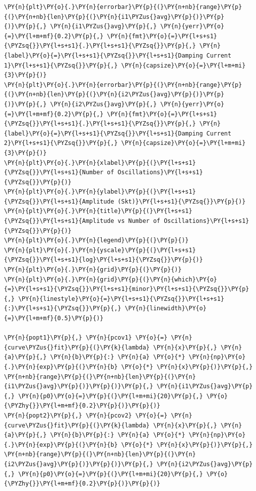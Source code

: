     \begin{tcolorbox}[breakable, size=fbox, boxrule=1pt, pad at break*=1mm,colback=cellbackground, colframe=cellborder]
\begin{Verbatim}[commandchars=\\\{\}]
\PY{n}{plt}\PY{o}{.}\PY{n}{errorbar}\PY{p}{(}\PY{n+nb}{range}\PY{p}{(}\PY{n+nb}{len}\PY{p}{(}\PY{n}{i1\PYZus{}avg}\PY{p}{)}\PY{p}{)}\PY{p}{,} \PY{n}{i1\PYZus{}avg}\PY{p}{,} \PY{n}{yerr}\PY{o}{=}\PY{l+m+mf}{0.2}\PY{p}{,} \PY{n}{fmt}\PY{o}{=}\PY{l+s+s1}{\PYZsq{}}\PY{l+s+s1}{.}\PY{l+s+s1}{\PYZsq{}}\PY{p}{,} \PY{n}{label}\PY{o}{=}\PY{l+s+s1}{\PYZsq{}}\PY{l+s+s1}{Damping Current 1}\PY{l+s+s1}{\PYZsq{}}\PY{p}{,} \PY{n}{capsize}\PY{o}{=}\PY{l+m+mi}{3}\PY{p}{)}
\PY{n}{plt}\PY{o}{.}\PY{n}{errorbar}\PY{p}{(}\PY{n+nb}{range}\PY{p}{(}\PY{n+nb}{len}\PY{p}{(}\PY{n}{i2\PYZus{}avg}\PY{p}{)}\PY{p}{)}\PY{p}{,} \PY{n}{i2\PYZus{}avg}\PY{p}{,} \PY{n}{yerr}\PY{o}{=}\PY{l+m+mf}{0.2}\PY{p}{,} \PY{n}{fmt}\PY{o}{=}\PY{l+s+s1}{\PYZsq{}}\PY{l+s+s1}{.}\PY{l+s+s1}{\PYZsq{}}\PY{p}{,} \PY{n}{label}\PY{o}{=}\PY{l+s+s1}{\PYZsq{}}\PY{l+s+s1}{Damping Current 2}\PY{l+s+s1}{\PYZsq{}}\PY{p}{,} \PY{n}{capsize}\PY{o}{=}\PY{l+m+mi}{3}\PY{p}{)}
\PY{n}{plt}\PY{o}{.}\PY{n}{xlabel}\PY{p}{(}\PY{l+s+s1}{\PYZsq{}}\PY{l+s+s1}{Number of Oscillations}\PY{l+s+s1}{\PYZsq{}}\PY{p}{)}
\PY{n}{plt}\PY{o}{.}\PY{n}{ylabel}\PY{p}{(}\PY{l+s+s1}{\PYZsq{}}\PY{l+s+s1}{Amplitude (Skt)}\PY{l+s+s1}{\PYZsq{}}\PY{p}{)}
\PY{n}{plt}\PY{o}{.}\PY{n}{title}\PY{p}{(}\PY{l+s+s1}{\PYZsq{}}\PY{l+s+s1}{Amplitude vs Number of Oscillations}\PY{l+s+s1}{\PYZsq{}}\PY{p}{)}
\PY{n}{plt}\PY{o}{.}\PY{n}{legend}\PY{p}{(}\PY{p}{)}
\PY{n}{plt}\PY{o}{.}\PY{n}{yscale}\PY{p}{(}\PY{l+s+s1}{\PYZsq{}}\PY{l+s+s1}{log}\PY{l+s+s1}{\PYZsq{}}\PY{p}{)}
\PY{n}{plt}\PY{o}{.}\PY{n}{grid}\PY{p}{(}\PY{p}{)}
\PY{n}{plt}\PY{o}{.}\PY{n}{grid}\PY{p}{(}\PY{n}{which}\PY{o}{=}\PY{l+s+s1}{\PYZsq{}}\PY{l+s+s1}{minor}\PY{l+s+s1}{\PYZsq{}}\PY{p}{,} \PY{n}{linestyle}\PY{o}{=}\PY{l+s+s1}{\PYZsq{}}\PY{l+s+s1}{:}\PY{l+s+s1}{\PYZsq{}}\PY{p}{,} \PY{n}{linewidth}\PY{o}{=}\PY{l+m+mf}{0.5}\PY{p}{)}

\PY{n}{popt1}\PY{p}{,} \PY{n}{pcov1} \PY{o}{=} \PY{n}{curve\PYZus{}fit}\PY{p}{(}\PY{k}{lambda} \PY{n}{x}\PY{p}{,} \PY{n}{a}\PY{p}{,} \PY{n}{b}\PY{p}{:} \PY{n}{a} \PY{o}{*} \PY{n}{np}\PY{o}{.}\PY{n}{exp}\PY{p}{(}\PY{n}{b} \PY{o}{*} \PY{n}{x}\PY{p}{)}\PY{p}{,} \PY{n+nb}{range}\PY{p}{(}\PY{n+nb}{len}\PY{p}{(}\PY{n}{i1\PYZus{}avg}\PY{p}{)}\PY{p}{)}\PY{p}{,} \PY{n}{i1\PYZus{}avg}\PY{p}{,} \PY{n}{p0}\PY{o}{=}\PY{p}{(}\PY{l+m+mi}{20}\PY{p}{,} \PY{o}{\PYZhy{}}\PY{l+m+mf}{0.2}\PY{p}{)}\PY{p}{)}
\PY{n}{popt2}\PY{p}{,} \PY{n}{pcov2} \PY{o}{=} \PY{n}{curve\PYZus{}fit}\PY{p}{(}\PY{k}{lambda} \PY{n}{x}\PY{p}{,} \PY{n}{a}\PY{p}{,} \PY{n}{b}\PY{p}{:} \PY{n}{a} \PY{o}{*} \PY{n}{np}\PY{o}{.}\PY{n}{exp}\PY{p}{(}\PY{n}{b} \PY{o}{*} \PY{n}{x}\PY{p}{)}\PY{p}{,} \PY{n+nb}{range}\PY{p}{(}\PY{n+nb}{len}\PY{p}{(}\PY{n}{i2\PYZus{}avg}\PY{p}{)}\PY{p}{)}\PY{p}{,} \PY{n}{i2\PYZus{}avg}\PY{p}{,} \PY{n}{p0}\PY{o}{=}\PY{p}{(}\PY{l+m+mi}{20}\PY{p}{,} \PY{o}{\PYZhy{}}\PY{l+m+mf}{0.2}\PY{p}{)}\PY{p}{)}


\end{Verbatim}
\end{tcolorbox}
